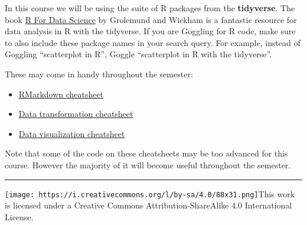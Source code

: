 \documentclass[
]{article}
\providecommand{\tightlist}{%
  \setlength{\itemsep}{0pt}\setlength{\parskip}{0pt}}
\begin{document}
In this course we will be using the suite of R packages from the \textbf{tidyverse}. The book \href{https://r4ds.had.co.nz/}{R For Data Science} by Grolemund and Wickham is a fantastic resource for data analysis in R with the tidyverse. If you are Goggling for R code, make sure to also include these package names in your search query. For example, instead of Goggling ``scatterplot in R'', Goggle ``scatterplot in R with the tidyverse''.

These may come in handy throughout the semester:

\begin{itemize}
\tightlist
\item
  \href{https://github.com/rstudio/cheatsheets/raw/main/rmarkdown-2.0.pdf}{RMarkdown cheatsheet}
\item
  \href{https://github.com/rstudio/cheatsheets/raw/main/data-transformation.pdf}{Data transformation cheatsheet}
\item
  \href{https://github.com/rstudio/cheatsheets/raw/main/data-visualization-2.1.pdf}{Data visualization cheatsheet}
\end{itemize}

Note that some of the code on these cheatsheets may be too advanced for this course. However the majority of it will become useful throughout the semester.

\begin{center}\rule{0.5\linewidth}{0.5pt}\end{center}

\texttt{[image: https://i.creativecommons.org/l/by-sa/4.0/88x31.png]}This work is licensed under a Creative Commons Attribution-ShareAlike 4.0 International License.
\end{document}
